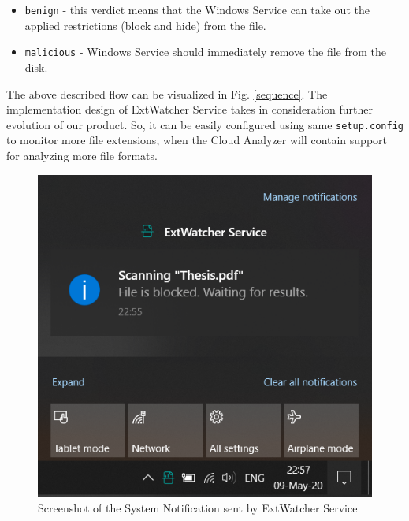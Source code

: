 \begin{itemize}
	\item \texttt{benign} - this verdict means that the Windows Service can take out the applied restrictions (block and hide) from the file.
	\item \texttt{malicious} - Windows Service should immediately remove the file from the disk.
\end{itemize}

The above described flow can be visualized in Fig. \ref{sequence}. The implementation design of ExtWatcher Service takes in consideration further evolution of our product. So, it can be easily configured using same \texttt{setup.config} to monitor more file extensions, when the Cloud Analyzer will contain support for analyzing more file formats.

\begin{figure}[H]
	\centerline{\includegraphics[scale=0.55]{figures/notification.png}}  
	\caption{Screenshot of the System Notification sent by ExtWatcher Service}
	\label{screenshot:notification}
\end{figure}

\newpage

